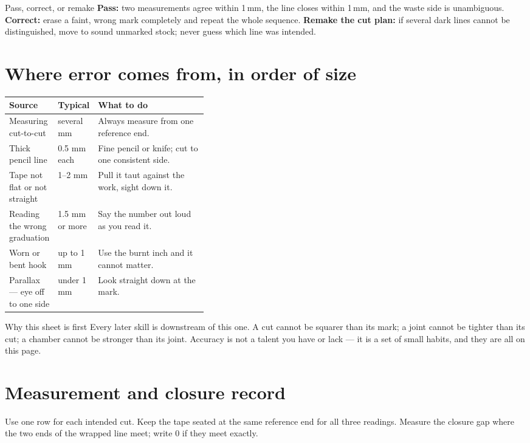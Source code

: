 \begin{telospanel}{Pass, correct, or remake}
\textbf{Pass:} two measurements agree within 1\,mm, the line closes within
1\,mm, and the waste side is unambiguous. \textbf{Correct:} erase a faint,
wrong mark completely and repeat the whole sequence. \textbf{Remake the cut
plan:} if several dark lines cannot be distinguished, move to sound unmarked
stock; never guess which line was intended.
\end{telospanel}

\section{Where error comes from, in order of size}
\begin{tabularx}{\linewidth}{@{}p{0.24\linewidth}p{0.14\linewidth}L@{}}
\toprule
\textbf{Source} & \textbf{Typical} & \textbf{What to do}\\
\midrule
Measuring cut-to-cut & several mm & Always measure from one reference end.\\
Thick pencil line & 0.5 mm each & Fine pencil or knife; cut to one consistent side.\\
Tape not flat or not straight & 1--2 mm & Pull it taut against the work, sight down it.\\
Reading the wrong graduation & 1.5 mm or more & Say the number out loud as you read it.\\
Worn or bent hook & up to 1 mm & Use the burnt inch and it cannot matter.\\
Parallax --- eye off to one side & under 1 mm & Look straight down at the mark.\\
\bottomrule
\end{tabularx}

\begin{telospanel}{Why this sheet is first}
Every later skill is downstream of this one. A cut cannot be squarer than its
mark; a joint cannot be tighter than its cut; a chamber cannot be stronger than
its joint. Accuracy is not a talent you have or lack --- it is a set of small
habits, and they are all on this page.
\end{telospanel}

\section{Measurement and closure record}
\noindent Use one row for each intended cut. Keep the tape seated at the same
reference end for all three readings. Measure the closure gap where the two
ends of the wrapped line meet; write \(0\) if they meet exactly.

